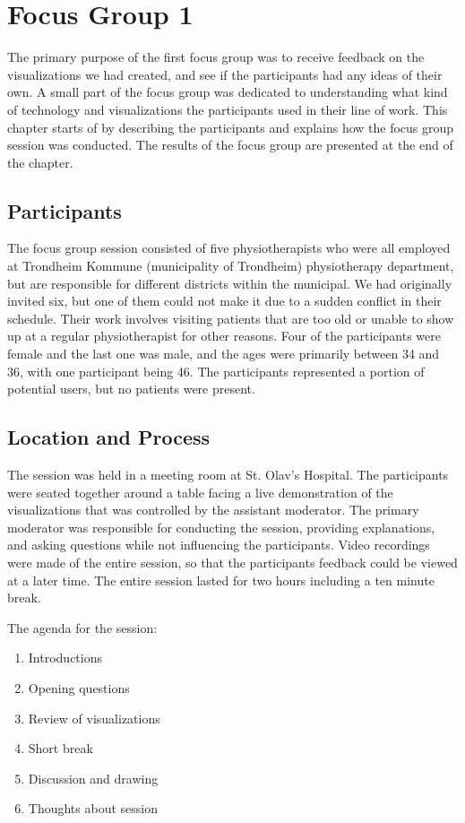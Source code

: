 \chapter{Focus Group 1}
\label{ch:focusGroup1}
The primary purpose of the first focus group was to receive feedback on the visualizations we had created, and see if the participants had any ideas of their own. A small part of the focus group was dedicated to understanding what kind of technology and visualizations the participants used in their line of work. This chapter starts of by describing the participants and explains how the focus group session was conducted. The results of the focus group are presented at the end of the chapter.

\section{Participants}
The focus group session consisted of five physiotherapists who were all employed at Trondheim Kommune (municipality of Trondheim) physiotherapy department, but are responsible for different districts within the municipal. We had originally invited six, but one of them could not make it due to a sudden conflict in their schedule. Their work involves visiting patients that are too old or unable to show up at a regular physiotherapist for other reasons. Four of the participants were female and the last one was male, and the ages were primarily between 34 and 36, with one participant being 46. The participants represented a portion of potential users, but no patients were present.

\section{Location and Process}
The session was held in a meeting room at St. Olav's Hospital. The participants were seated together around a table facing a live demonstration of the visualizations that was controlled by the assistant moderator. The primary moderator was responsible for conducting the session, providing explanations, and asking questions while not influencing the participants. Video recordings were made of the entire session, so that the participants feedback could be viewed at a later time. The entire session lasted for two hours including a ten minute break.

The agenda for the session:
\begin{enumerate}[itemsep=0cm, parsep=0cm]
  \item Introductions
  \item Opening questions
  \item Review of visualizations
  \item Short break
  \item Discussion and drawing
  \item Thoughts about session
\end{enumerate}

